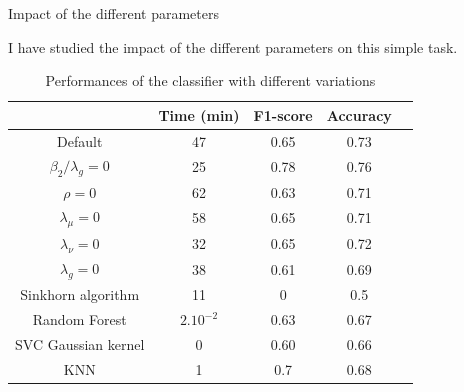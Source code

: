 \documentclass[french]{beamer}
\begin{document}
\begin{frame}{Impact of the different parameters }

I have studied the impact of the different parameters on this simple task. 
    
\begin{table}[h]
    \centering
    \begin{tabular}{|c|c|c|c|c|}
        \hline
        & Time (min) & F1-score & Accuracy \\
        \hline
        Default & 47 & 0.65 & 0.73 \\
        \hline
        $\beta_2/\lambda_g = 0$ & 25 & 0.78 & 0.76 \\
        \hline
        $\rho = 0$ & 62 & 0.63 & 0.71 \\
        \hline
        $\lambda_\mu = 0$ & 58 & 0.65 & 0.71 \\
        \hline
        $\lambda_\nu = 0 $ & 32 & 0.65 & 0.72 \\
        \hline
        $\lambda_g = 0$ & 38 & 0.61 & 0.69 \\
        \hline
        Sinkhorn algorithm  & 11 & 0 & 0.5 \\
        \hline
        Random Forest &$ 2.10^{-2}$& 0.63 & 0.67\\
        \hline
        SVC Gaussian kernel  &0 &0.60 & 0.66 \\
        \hline
        KNN & 1 & 0.7 & 0.68 \\
        \hline
    \end{tabular}
    \caption{Performances of the classifier with different variations}
    \label{tab:results}
\end{table}
    
\end{frame}
\end{document}
